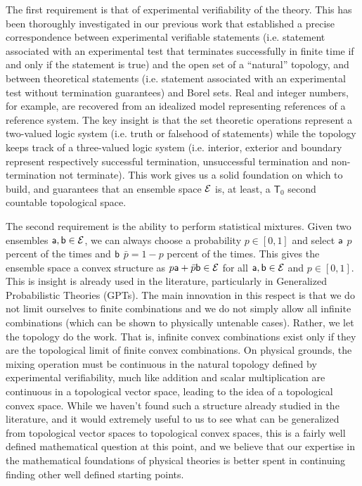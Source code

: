 The first requirement is that of experimental verifiability of the theory. This has been thoroughly investigated in our previous work that established a precise correspondence between experimental verifiable statements (i.e. statement associated with an experimental test that terminates successfully in finite time if and only if the statement is true) and the open set of a ``natural'' topology, and between theoretical statements (i.e. statement associated with an experimental test without termination guarantees) and Borel sets. Real and integer numbers, for example, are recovered from an idealized model representing references of a reference system. The key insight is that the set theoretic operations represent a two-valued logic system (i.e. truth or falsehood of statements) while the topology keeps track of a three-valued logic system (i.e. interior, exterior and boundary represent respectively successful termination, unsuccessful termination and non-termination not terminate). This work gives us a solid foundation on which to build, and guarantees that an ensemble space $\Ens$ is, at least, a $\mathsf{T}_0$ second countable topological space.

The second requirement is the ability to perform statistical mixtures. Given two ensembles $\ens[a], \ens[b] \in \Ens$, we can always choose a probability $p \in [0,1]$ and select $\ens[a]$ $p$ percent of the times and $\ens[b]$ $\bar{p} = 1-p$ percent of the times. This gives the ensemble space a convex structure as $p \ens[a] + \bar{p} \ens[b] \in \Ens$ for all $\ens[a], \ens[b] \in \Ens$ and $p \in [0,1]$. This is insight is already used in the literature, particularly in Generalized Probabilistic Theories (GPTs). The main innovation in this respect is that we do not limit ourselves to finite combinations and we do not simply allow all infinite combinations (which can be shown to physically untenable cases). Rather, we let the topology do the work. That is, infinite convex combinations exist only if they are the topological limit of finite convex combinations. On physical grounds, the mixing operation must be continuous in the natural topology defined by experimental verifiability, much like addition and scalar multiplication are continuous in a topological vector space, leading to the idea of a topological convex space. While we haven't found such a structure already studied in the literature, and it would extremely useful to us to see what can be generalized from topological vector spaces to topological convex spaces, this is a fairly well defined mathematical question at this point, and we believe that our expertise in the mathematical foundations of physical theories is better spent in continuing finding other well defined starting points.

